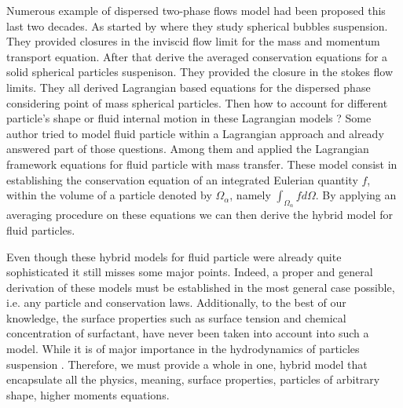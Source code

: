 Numerous example of dispersed two-phase flows model had been proposed this last two decades.
As started by \citep{zhang1994averaged,zhang1994ensemble} where they study spherical bubbles suspension.
They provided closures in the inviscid flow limit for the mass and momentum transport equation. 
After that \citet{jackson1997locally,zhang1997momentum} derive the averaged conservation equations for a solid spherical particles suspenison.
They provided the closure in the stokes flow limits.  
They all derived Lagrangian based equations for the dispersed phase considering point of mass spherical particles.
Then how to account for different particle's shape or fluid internal motion in these Lagrangian models ?
Some author tried to model fluid particle within a Lagrangian approach and already answered part of those questions.  
Among them \citet{lhuillier2000bilan} and \citet{morel2015mathematical,zaepffel2012multisize} applied the Lagrangian framework equations for fluid particle with mass transfer. 
These model consist in establishing the conservation equation of an integrated Eulerian quantity $f$, within the volume of a particle denoted by $\Omega_\alpha$, namely  $\int_{\Omega_\alpha} f d\Omega$. 
By applying an averaging procedure on these equations we can then derive the hybrid model for fluid particles. 

Even though these hybrid models for fluid particle were already quite sophisticated it still misses some major points. 
Indeed, a proper and general derivation of these models must be established in the most general case possible, i.e. any particle and conservation laws. 
Additionally, to the best of our knowledge, the surface properties such as surface tension and chemical concentration of surfactant, have never been taken into account into such a model. 
While it is of major importance in the hydrodynamics of particles suspension \citet{kentheswaran2022direct}. 
Therefore, we must provide a whole in one, hybrid model that encapsulate all the physics, meaning, surface properties, particles of arbitrary shape, higher moments equations. 


